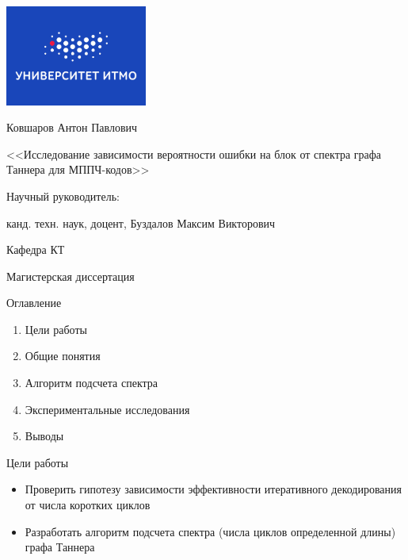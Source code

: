 \documentclass[t,13pt,graphics=pdflatex,xcolor=table,aspectratio=43]{beamer}
\begin{document}
\begingroup
{}
\begin{frame}[plain]
\color{white}
\centering\bfseries
\includegraphics[width=0.35\textwidth]{itmo_small_blue_rus.png}

{\Large Ковшаров Антон Павлович \par}

\vspace{0pt plus 0.3filll}

{\large {<<}Исследование зависимости вероятности ошибки на блок от спектра 
            графа Таннера для МППЧ-кодов{>>}}

\vspace{0pt plus 0.3filll}

{\small Научный руководитель:\par
 канд. техн. наук, доцент, Буздалов Максим Викторович}

\vspace{0pt plus 0.3filll}

{\small Кафедра КТ \hfill } 

\vspace{0pt plus 1filll}
\end{frame}
\endgroup

\begin{frame}{Магистерская диссертация}
\begin{block}{Оглавление}
\begin{enumerate}
    \item Цели работы
    \item Общие понятия 
    \item Алгоритм подсчета спектра
    \item Экспериментальные исследования
    \item Выводы
\end{enumerate}
\end{block}
\end{frame}

\begin{frame}{Цели работы}
\begin{itemize}
  \item Проверить гипотезу зависимости эффективности итеративного декодирования от числа коротких циклов
  \item Разработать алгоритм подсчета спектра (числа циклов определенной длины) графа Таннера
\end{itemize}
\end{frame}
\end{document}
